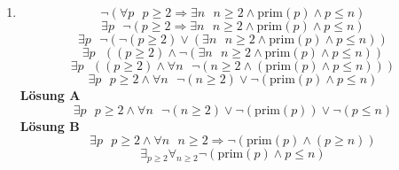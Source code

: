 \documentclass[a4paper]{article}
\begin{document}
\begin{enumerate}
		\item
		\begin{equation*}
			\lnot (\forall p \text{ } p \geq 2 \Rightarrow \exists n \text{ } n \geq 2 \land \text{prim}(p) \land p \leq n)
		\end{equation*}
		\begin{equation*}
			\exists p \text{ } \lnot(p \geq 2 \Rightarrow \exists n \text{ } n \geq 2 \land \text{prim}(p) \land p \leq n)
		\end{equation*}
		\begin{equation*}
			\exists p \text{ } \lnot(\lnot (p \geq 2) \lor (\exists n \text{ } n \geq 2 \land \text{prim}(p) \land p \leq n))
		\end{equation*}
		\begin{equation*}
			\exists p \text{ } ((p \geq 2) \land \lnot (\exists n \text{ } n \geq 2 \land \text{prim}(p) \land p \leq n))
		\end{equation*}
		\begin{equation*}
			\exists p \text{ } ((p \geq 2) \land \forall n \text{ } \lnot (n \geq 2 \land (\text{prim}(p) \land p \leq n)))
		\end{equation*}
		\begin{equation*}
			\exists p \text{ } p \geq 2 \land \forall n \text{ } \lnot (n \geq 2) \lor \lnot (\text{prim}(p) \land p \leq n)
		\end{equation*}
		\textbf{Lösung A}
		\begin{equation*}
			\exists p \text{ } p \geq 2 \land \forall n \text{ } \lnot (n \geq 2) \lor \lnot (\text{prim}(p)) \lor \lnot (p \leq n)
		\end{equation*}
		\textbf{Lösung B}
		\begin{equation*}
			\exists p \text{ } p \geq 2 \land \forall n \text{ } n \geq 2 \Rightarrow \lnot (\text{prim}(p) \land (p \geq n))
		\end{equation*}
		\begin{equation*}
			\exists_{p \geq 2} \forall_{n \geq 2} \lnot(\text{prim}(p) \land p \leq n)
		\end{equation*}
		

\end{enumerate}
\end{document}
